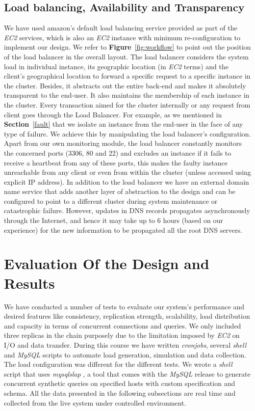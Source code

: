 \documentclass[12pt]{article}
\begin{document}
\subsection{Load balancing, Availability and Transparency}
\label{lb.a.t} We have
used amazon's default load balancing service provided as part of the \emph{EC2}
services, which is also an \emph{EC2} instance with minimum re-configuration to
implement our design. We refer to \textbf{Figure}~\ref{fig:workflow} to point
out the position of the load balancer in the overall layout. The load balancer
considers the system load in individual instance, its geographic location (in
\emph{EC2} terms) and the client's geographical location to forward a specific
request to a specific instance in the cluster. Besides, it abstracts out the
entire back-end and makes it absolutely transparent to the end-user. It also
maintains the membership of each instance in the cluster. Every transaction
aimed for the cluster internally or any request from client goes through the Load Balancer.
For example, as we mentioned in \textbf{Section}~\ref{fault} that we isolate an
instance from the end-user in the face of any type of failure. We achieve this
by manipulating the load balancer's configuration. Apart from our own monitoring
module, the load balancer constantly monitors the concerned ports (3306, 80 and
22) and excludes an instance if it fails to receive a heartbeat from any of
these ports, this makes the faulty instance unreachable from any client or even
from within the cluster (unless accessed using explicit IP address). In addition
to the load balancer we have an external domain name service that adds another
layer of abstraction to the design and can be configured to point to a different
cluster during system maintenance or catastrophic failure. However, updates in
DNS records propagates asynchronously through the Internet, and hence it may
take up to 6 hours (based on our experience) for the new information to be
propagated all the root DNS servers.

\section{Evaluation Of the Design and Results} We have conducted a number of
tests to evaluate our system's performance and desired features like consistency,
replication strength, scalability, load distribution and capacity in terms of
concurrent connections and queries. We only included three replicas in the chain
purposely due to the limitation imposed by \emph{EC2} \cite{freetier} on I/O and
data transfer. During this course we have written \emph{cronjobs}, several \emph{shell} and
\emph{MySQL} scripts to automate load generation, simulation and data
collection. The load configuration was different for the different tests. We
wrote a \emph{shell} script that uses \emph{mysqlslap} \cite{mysqlslap}, a tool
that comes with the \emph{MySQL} release to generate concurrent synthetic queries on
specified hosts with custom specification and schema. All the data presented in
the following subsections are real time and collected from the live system under
controlled environment.  
\end{document}
